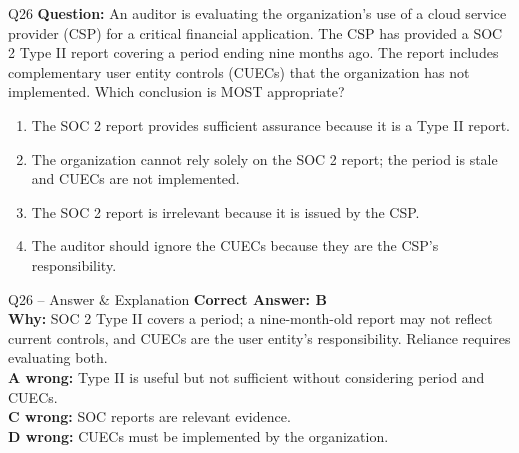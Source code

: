 \documentclass[aspectratio=169,10pt]{beamer}
\begin{document}
	\begin{frame}[t]{Q26}
		\small
		\textbf{Question:} An auditor is evaluating the organization's use of a cloud service provider (CSP) for a critical financial application. The CSP has provided a SOC 2 Type II report covering a period ending nine months ago. The report includes complementary user entity controls (CUECs) that the organization has not implemented. Which conclusion is MOST appropriate?
		\begin{enumerate}[label=\Alph*.,itemsep=1pt,topsep=2pt]
			\item The SOC 2 report provides sufficient assurance because it is a Type II report.
			\item The organization cannot rely solely on the SOC 2 report; the period is stale and CUECs are not implemented.
			\item The SOC 2 report is irrelevant because it is issued by the CSP.
			\item The auditor should ignore the CUECs because they are the CSP's responsibility.
		\end{enumerate}
	\end{frame}
	
	\begin{frame}[t]{Q26 -- Answer \& Explanation}
		\small
		\textbf{Correct Answer: B} \\[4pt]
		\textbf{Why:} SOC 2 Type II covers a period; a nine-month-old report may not reflect current controls, and CUECs are the user entity's responsibility. Reliance requires evaluating both. \\[4pt]
		\textbf{A wrong:} Type II is useful but not sufficient without considering period and CUECs. \\[2pt]
		\textbf{C wrong:} SOC reports are relevant evidence. \\[2pt]
		\textbf{D wrong:} CUECs must be implemented by the organization.
	\end{frame}
	
\end{document}
